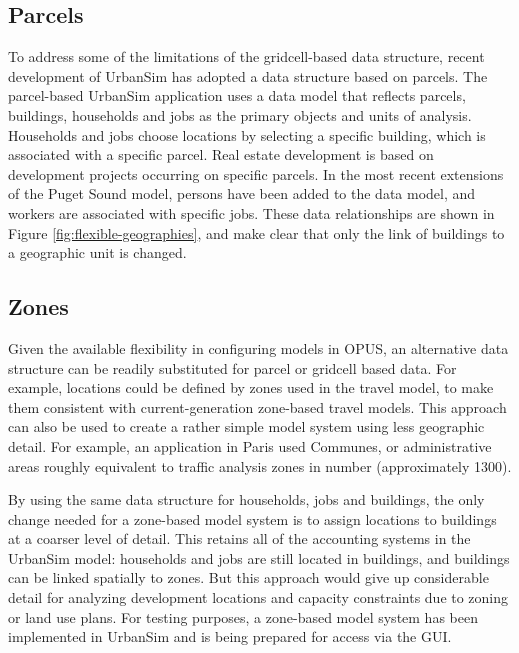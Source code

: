 \subsection{Parcels}


To address some of the limitations of the gridcell-based data structure, recent development of UrbanSim has adopted a data structure based on parcels.
The parcel-based UrbanSim application uses a data model that reflects parcels, buildings, households and jobs as the
primary objects and units of analysis.  Households and jobs
choose locations by selecting a specific building, which is associated with a specific parcel.
Real estate development is based on development projects occurring on specific parcels.  In the most recent extensions of the Puget Sound model,
persons have been added to the data model, and workers are associated with specific jobs.  These data relationships
are shown in Figure \ref{fig:flexible-geographies}, and make clear that only the link of buildings to a geographic unit is changed.


\subsection{Zones}

Given the available flexibility in configuring models in OPUS, an alternative data structure can be readily substituted for parcel or gridcell based data.  For example, locations could be defined by zones used in the travel model, to make them consistent with current-generation zone-based travel models.  This approach can also be used to create a rather simple model system using less geographic detail.  For example, an application in Paris used Communes, or administrative areas roughly equivalent to traffic analysis zones in number (approximately 1300).

By using the same data structure for households, jobs and buildings, the only change needed for a zone-based model system is to assign locations to buildings at a coarser level of detail.  This retains all of the accounting systems in the UrbanSim model: households and jobs are still located in buildings, and buildings can be linked spatially to zones.  But this approach would give up considerable detail for analyzing development locations and capacity constraints due to zoning or land use plans. For testing purposes, a zone-based model system has been implemented in UrbanSim and is being prepared for access via the GUI.

